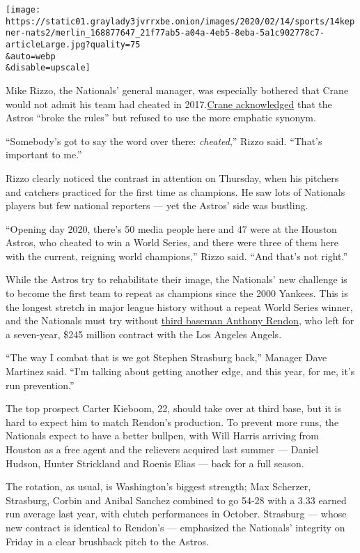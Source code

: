 \texttt{[image: https://static01.graylady3jvrrxbe.onion/images/2020/02/14/sports/14kepner-nats2/merlin\_168877647\_21f77ab5-a04a-4eb5-8eba-5a1c902778c7-articleLarge.jpg?quality=75\\\&auto=webp\\\&disable=upscale]}

Mike Rizzo, the Nationals' general manager, was especially bothered that
Crane would not admit his team had cheated in
2017.\href{https://www.nytimes3xbfgragh.onion/2020/02/13/sports/baseball/astros-scandal-players.html?action=click\&module=RelatedLinks\&pgtype=Article}{Crane
acknowledged} that the Astros ``broke the rules'' but refused to use the
more emphatic synonym.

``Somebody's got to say the word over there: \emph{cheated},'' Rizzo
said. ``That's important to me.''

Rizzo clearly noticed the contrast in attention on Thursday, when his
pitchers and catchers practiced for the first time as champions. He saw
lots of Nationals players but few national reporters --- yet the Astros'
side was bustling.

``Opening day 2020, there's 50 media people here and 47 were at the
Houston Astros, who cheated to win a World Series, and there were three
of them here with the current, reigning world champions,'' Rizzo said.
``And that's not right.''

While the Astros try to rehabilitate their image, the Nationals' new
challenge is to become the first team to repeat as champions since the
2000 Yankees. This is the longest stretch in major league history
without a repeat World Series winner, and the Nationals must try without
\href{https://www.nytimes3xbfgragh.onion/2019/10/31/sports/world-series-anthony-rendon-nationals.html}{third
baseman Anthony Rendon}, who left for a seven-year, \$245 million
contract with the Los Angeles Angels.

``The way I combat that is we got Stephen Strasburg back,'' Manager Dave
Martinez said. ``I'm talking about getting another edge, and this year,
for me, it's run prevention.''

The top prospect Carter Kieboom, 22, should take over at third base, but
it is hard to expect him to match Rendon's production. To prevent more
runs, the Nationals expect to have a better bullpen, with Will Harris
arriving from Houston as a free agent and the relievers acquired last
summer --- Daniel Hudson, Hunter Strickland and Roenis Elias --- back
for a full season.

The rotation, as usual, is Washington's biggest strength; Max Scherzer,
Strasburg, Corbin and Anibal Sanchez combined to go 54-28 with a 3.33
earned run average last year, with clutch performances in October.
Strasburg --- whose new contract is identical to Rendon's --- emphasized
the Nationals' integrity on Friday in a clear brushback pitch to the
Astros.

